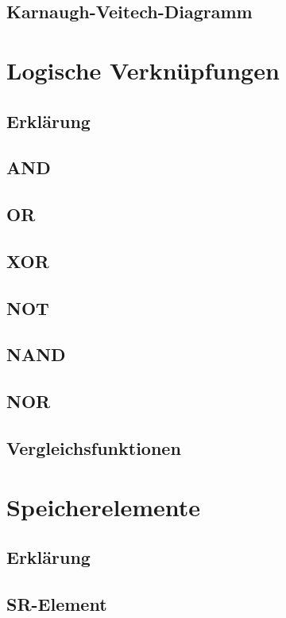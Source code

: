 	\subsection{Karnaugh-Veitech-Diagramm}\label{kap: kv}
	\section{Logische Verknüpfungen}\label{kap: logischrVerknüpf}
	\subsection{Erklärung}\label{kap: erklärungLogisch}
	\subsection{AND}\label{kap: and}
	\subsection{OR}\label{kap: or}
	\subsection{XOR}\label{kap: xor}
	\subsection{NOT}\label{kap: not}
	\subsection{NAND}\label{kap: nand}
	\subsection{NOR}\label{kap: nor}
	\subsection{Vergleichsfunktionen}\label{kap: vergleichsfunk}
	\section{Speicherelemente}\label{kap: speicherelemente}
	\subsection{Erklärung}\label{kap: erklärungSpeicher}
	\subsection{SR-Element}\label{kap: srElement}
